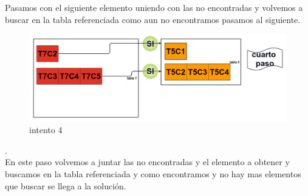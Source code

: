 Pasamos con el siguiente elemento uniendo con las no encontradas y volvemos a buscar en la tabla referenciada como aun no encontramos pasamos al siguiente.\\
\begin{figure}[hbtp]
\centering
\includegraphics[scale=0.35]{images/paso4.png}
\caption{intento 4}\label{intento4}
\end{figure}.\\

En este paso volvemos a juntar las no encontradas y el elemento a obtener y buscamos en la tabla referenciada y como encontramos y no hay mas elementos que buscar se llega a la soluci\'on.\\


 
 






  

 
   









